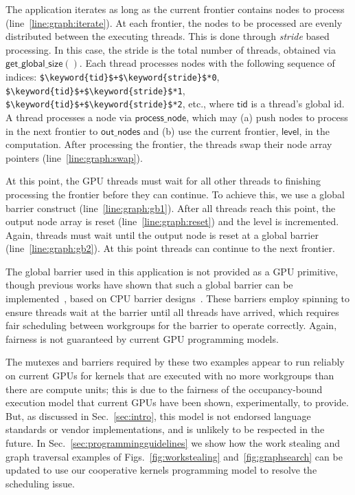 \documentclass[numbers,nocopyrightspace,10pt]{sigplanconf}
\newcommand{\myfigs}{Figs.~}
\newcommand{\mysec}{Sec.~}
\newcommand{\code}[1]{\lstset{basicstyle=\tt}\lstinline!#1!\lstset{basicstyle=\scriptsize\tt}}
\newcommand{\getglobalsize}{\mathsf{get\_global\_size}}
\newcommand{\keyword}[1]{\mathsf{#1}}
\begin{document}
The application iterates as long as the current frontier contains
nodes to process (line~\ref{line:graph:iterate}). At each frontier,
the nodes to be processed are evenly distributed between the executing
threads. This is done through \emph{stride} based processing. 
%
In this case, the stride is the total number of threads, obtained via 
$\getglobalsize()$.  Each thread processes nodes with the following sequence of indices:
\code{$\keyword{tid}$+$\keyword{stride}$*0},
\code{$\keyword{tid}$+$\keyword{stride}$*1},
\code{$\keyword{tid}$+$\keyword{stride}$*2}, etc., where $\keyword{tid}$ is a thread's global id.
A thread processes a node via $\keyword{process\_node}$, which may (a) push nodes to process in the next frontier to
$\keyword{out\_nodes}$ and (b) use the current frontier, $\keyword{level}$, in
the computation. After processing the frontier, the threads swap their
node array pointers (line~\ref{line:graph:swap}).

At this point, the GPU threads must wait for all other threads to
finishing processing the frontier before they can continue. To achieve
this, we use a global barrier construct
(line~\ref{line:graph:gb1}). After all threads reach this point, the
output node array is reset (line~\ref{line:graph:reset}) and the level
is incremented. Again, threads must wait until the output node is
reset at a global barrier (line~\ref{line:graph:gb2}). At this point
threads can continue to the next frontier.

The global barrier used in this application is not provided as a GPU
primitive, though previous works have shown that such a global
barrier can be implemented~\cite{XF10,DBLP:conf/oopsla/SorensenDBGR16},
based on CPU barrier designs~\cite[ch. 17]{HS08}.
 These barriers employ spinning to ensure threads wait at the barrier until all
threads have arrived, which requires fair
scheduling between workgroups for the barrier to operate correctly.
Again, fairness is not guaranteed by current GPU programming models.

The mutexes and barriers required by these two examples appear to run
reliably on current GPUs for kernels that are executed with no more
workgroups than there are compute units; this is due to the fairness
of the occupancy-bound execution model that current GPUs have been
shown, experimentally, to provide.  But, as discussed in
\mysec\ref{sec:intro}, this model is not endorsed
language standards or vendor implementations, and is unlikely to be respected in the future.
%
In \mysec\ref{sec:programmingguidelines} we show how the work stealing
and graph traversal examples of \myfigs\ref{fig:workstealing} and~\ref{fig:graphsearch} can be
updated to use our cooperative kernels programming model to resolve
the scheduling issue.
\end{document}
